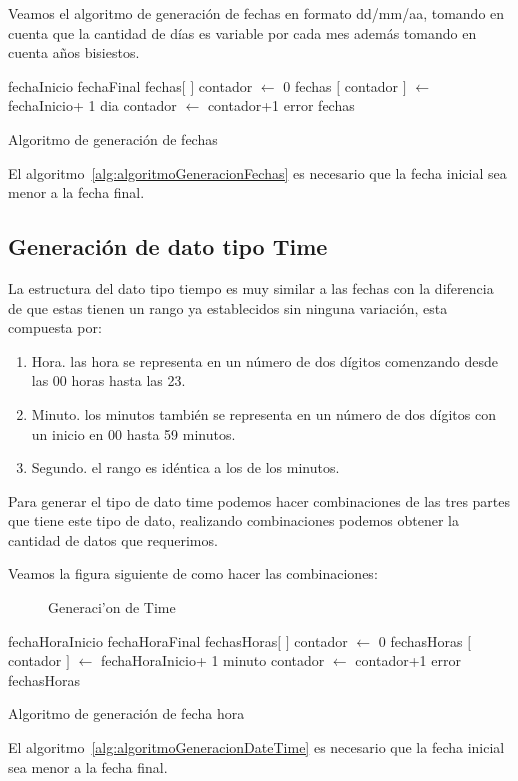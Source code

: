 Veamos el algoritmo de generaci\'on de fechas en formato dd/mm/aa, tomando en cuenta que la cantidad de d\'ias es variable por cada mes adem\'as tomando en cuenta a\~nos bisiestos.
\begin{algorithm}[H]
\begin{algorithmic}[1]
\REQUIRE fechaInicio fechaFinal
\STATE fechas$[$ $]$
\STATE contador $\leftarrow$ 0
	\STATE fechas $[$ contador $]$ $\leftarrow$ fechaInicio+ 1 dia
	\STATE contador $\leftarrow$ contador+1
	\ENDWHILE
\ELSE
	\RETURN error
\ENDIF
\RETURN fechas
\end{algorithmic}
\caption{Algoritmo de generaci\'on de fechas}\label{alg:algoritmoGeneracionFechas}
\end{algorithm}
El algoritmo~\ref{alg:algoritmoGeneracionFechas} es necesario que la fecha inicial sea menor a la fecha final.

\subsection{Generaci\'on de dato tipo Time}
La estructura del dato tipo tiempo es muy similar a las fechas con la diferencia de que estas tienen un rango ya establecidos sin ninguna variaci\'on, esta compuesta por:
\begin{enumerate}
\item Hora. las hora se representa en un n\'umero de dos d\'igitos comenzando desde las 00 horas hasta las 23.
\item Minuto. los minutos tambi\'en se representa en un n\'umero de dos d\'igitos con un inicio en 00 hasta 59 minutos.
\item Segundo. el rango es id\'entica a los de los minutos.
\end{enumerate}
Para generar el tipo de dato time podemos hacer combinaciones de las tres partes que tiene este tipo de dato, realizando combinaciones podemos obtener la cantidad de datos que requerimos.

Veamos la figura siguiente de como hacer las combinaciones:

\begin{figure}[H]
\centering
{}
\caption{Generaci'on de Time} \label{fig:generacion de Time}
\end{figure}
\begin{algorithm}[H]
\begin{algorithmic}[1]
\REQUIRE fechaHoraInicio fechaHoraFinal
\STATE fechasHoras$[$ $]$
\STATE contador $\leftarrow$ 0
	\STATE fechasHoras $[$ contador $]$ $\leftarrow$ fechaHoraInicio+ 1 minuto
	\STATE contador $\leftarrow$ contador+1
	\ENDWHILE
\ELSE
	\RETURN error
\ENDIF
\RETURN fechasHoras
\end{algorithmic}
\caption{Algoritmo de generaci\'on de fecha hora}\label{alg:algoritmoGeneracionDateTime}
\end{algorithm}
El algoritmo~\ref{alg:algoritmoGeneracionDateTime} es necesario que la fecha inicial sea menor a la fecha final.\\
